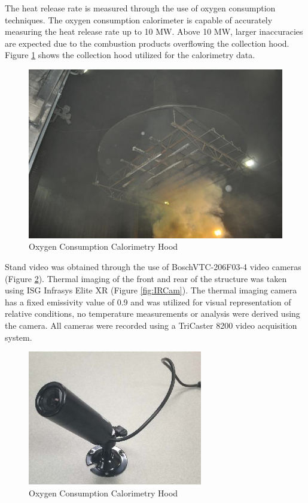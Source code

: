\documentclass{article}
\begin{document}
The heat release rate is measured through the use of oxygen consumption techniques. The oxygen consumption calorimeter is capable of accurately measuring the heat release rate up to 10 MW. Above 10 MW, larger inaccuracies are expected due to the combustion products overflowing the collection hood. Figure \ref{fig:Hood} shows the collection hood utilized for the calorimetry data.

\begin{figure} [H]
	\centering
	\includegraphics[width = 5in]{0_Images/Instrumentation/Calorimetry_hood.jpg}
	\caption{Oxygen Consumption Calorimetry Hood}
	\label{fig:Hood}
\end{figure}

Stand video was obtained through the use of BoschVTC-206F03-4 video cameras (Figure \ref{fig:BullettCam}). Thermal imaging of the front and rear of the structure was taken using ISG Infrasys Elite XR (Figure \ref{fig:IRCam}). The thermal imaging camera has a fixed emissivity value of 0.9 and was utilized for visual representation of relative conditions, no temperature measurements or analysis were derived using the camera. All cameras were recorded using a TriCaster 8200 video acquisition system.

\begin{figure} [H]
	\centering
	\includegraphics[width = 3in]{0_Images/Instrumentation/BullettCam.jpg}
	\caption{Oxygen Consumption Calorimetry Hood}
	\label{fig:BullettCam}
\end{figure}
\end{document}
